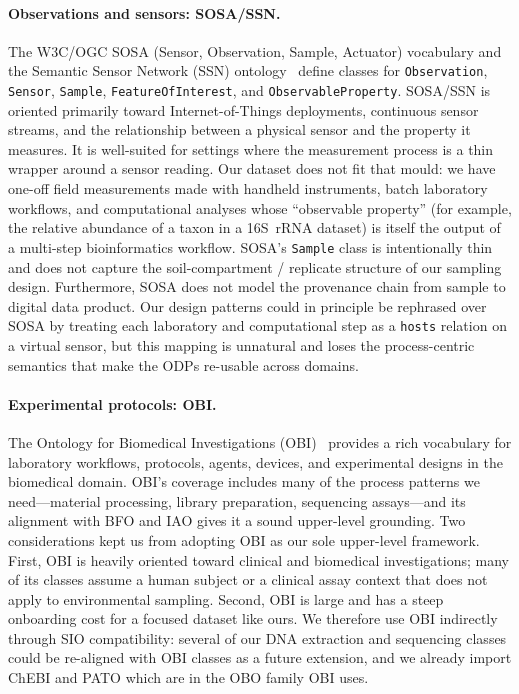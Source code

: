 \documentclass[11pt,a4paper]{article}
\begin{document}
\paragraph{Observations and sensors: SOSA/SSN.}
The W3C/OGC SOSA (Sensor, Observation, Sample, Actuator)
vocabulary and the Semantic Sensor Network (SSN)
ontology~\cite{sosa} define classes for \texttt{Observation},
\texttt{Sensor}, \texttt{Sample}, \texttt{FeatureOfInterest}, and
\texttt{ObservableProperty}. SOSA/SSN is oriented primarily toward
Internet-of-Things deployments, continuous sensor streams, and the
relationship between a physical sensor and the property it measures.
It is well-suited for settings where the measurement process is a
thin wrapper around a sensor reading. Our dataset does not fit that
mould: we have one-off field measurements made with handheld
instruments, batch laboratory workflows, and computational analyses
whose ``observable property'' (for example, the relative abundance
of a taxon in a 16S~rRNA dataset) is itself the output of a multi-step
bioinformatics workflow. SOSA's \texttt{Sample} class is intentionally
thin and does not capture the soil-compartment / replicate structure
of our sampling design. Furthermore, SOSA does not model the
provenance chain from sample to digital data product. Our design
patterns could in principle be rephrased over SOSA by treating each
laboratory and computational step as a \texttt{hosts} relation on a
virtual sensor, but this mapping is unnatural and loses the
process-centric semantics that make the ODPs re-usable across
domains.

\paragraph{Experimental protocols: OBI.}
The Ontology for Biomedical Investigations (OBI)~\cite{obi} provides
a rich vocabulary for laboratory workflows, protocols, agents,
devices, and experimental designs in the biomedical
domain. OBI's coverage includes many of the process patterns we
need---material processing, library preparation, sequencing
assays---and its alignment with BFO and IAO gives it a sound
upper-level grounding. Two considerations kept us from adopting OBI
as our sole upper-level framework. First, OBI is heavily oriented
toward clinical and biomedical investigations; many of its classes
assume a human subject or a clinical assay context that does not
apply to environmental sampling. Second, OBI is large and has a
steep onboarding cost for a focused dataset like ours. We therefore
use OBI indirectly through SIO compatibility: several of our DNA
extraction and sequencing classes could be re-aligned with OBI
classes as a future extension, and we already import ChEBI and PATO
which are in the OBO family OBI uses.
\end{document}
